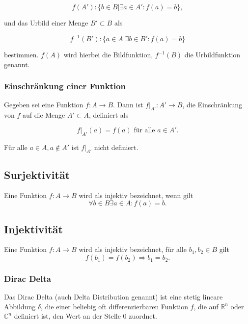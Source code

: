 \documentclass[a4paper,fontsize=12pt,toc=bib,parskip=half,ngerman]{scrartcl}
\begin{document}
\begin{equation}
	f(A'): \{ b \in B | \exists a \in A' : f(a) = b \},
\end{equation}

und das Urbild einer Menge $B' \subset B$ als

\begin{equation}
	f^{-1}(B'): \{ a \in A | \exists b \in B' : f(a) = b\}
\end{equation}

bestimmen. $f(A)$ wird hierbei die Bildfunktion, $f^{-1}(B)$ die Urbildfunktion genannt. 

\subsubsection{Einschr\"ankung einer Funktion}
Gegeben sei eine Funktion $f: A \rightarrow B$. Dann ist $f|_{A'}: A' \rightarrow B$, die Einschr\"ankung von $f$ auf die Menge $A' \subset A$, definiert als 

\begin{equation}
	f|_{A'}(a) = f(a) \text{ f\"ur alle } a \in A'.
\end{equation}

F\"ur alle $a \in A, a \notin A'$ ist $f|_{A'}$ nicht definiert. 


\subsection{Surjektivit\"at}
Eine Funktion $f:A\rightarrow B$ wird als injektiv bezeichnet, wenn gilt
\begin{equation}
\forall b \in B \exists a \in A : f(a) = b.
\end{equation}

\subsection{Injektivit\"at}
Eine Funktion $f:A\rightarrow B$ wird als injektiv bezeichnet, f\"ur alle $b_1, b_2 \in B$ gilt
\begin{equation}
f(b_1) = f(b_2) \Rightarrow b_1 = b_2.
\end{equation}

\subsubsection{Dirac Delta}
Das Dirac Delta (auch Delta Distribution genannt) ist eine stetig lineare Abbildung $\delta$, die einer beliebig oft differenzierbaren Funktion $f$, die auf $\mathbb{R}^n$ oder $\mathbb{C}^n$ definiert ist, den Wert an der Stelle 0 zuordnet.
\end{document}
